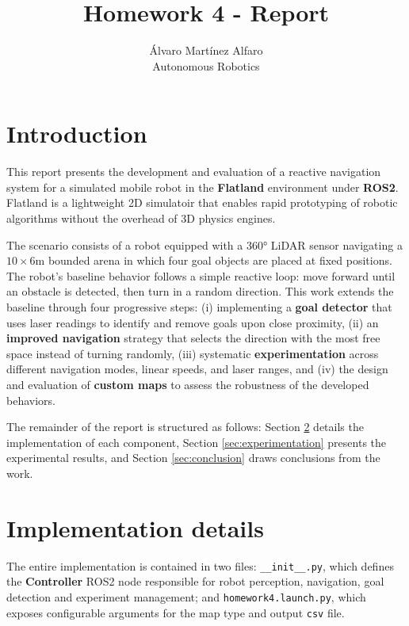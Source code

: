 \documentclass[12pt]{article}
\begin{document}
\title{Homework 4 - Report}
\author{Álvaro Martínez Alfaro\\
    Autonomous Robotics}

\maketitle

\section{Introduction}

This report presents the development and evaluation of a reactive navigation system for a simulated
mobile robot in the \textbf{Flatland} environment under \textbf{ROS2}. Flatland is a lightweight 2D
simulatoir that enables rapid prototyping of robotic algorithms without the overhead of 3D physics
engines.

The scenario consists of a robot equipped with a 360° LiDAR sensor navigating a $10 \times 6$m
bounded arena in which four goal objects are placed at fixed positions. The robot's baseline
behavior follows a simple reactive loop: move forward until an obstacle is detected, then turn in a
random direction. This work extends the baseline through four progressive steps: (i) implementing a
\textbf{goal detector} that uses laser readings to identify and remove goals upon close proximity,
(ii) an \textbf{improved navigation} strategy that selects the direction with the most free space
instead of turning randomly, (iii) systematic \textbf{experimentation} across different navigation
modes, linear speeds, and laser ranges, and (iv) the design and evaluation of \textbf{custom maps}
to assess the robustness of the developed behaviors.

The remainder of the report is structured as follows: Section \ref{sec:implementation} details the
implementation of each component, Section \ref{sec:experimentation} presents the experimental
results, and Section \ref{sec:conclusion} draws conclusions from the work.


\section{Implementation details} \label{sec:implementation}

The entire implementation is contained in two files: \texttt{\_\_init\_\_.py}, which defines the
\textbf{Controller} ROS2 node responsible for robot perception, navigation, goal detection and
experiment management; and \texttt{homework4.launch.py}, which exposes configurable arguments for
the map type and output \texttt{csv} file.
\end{document}
